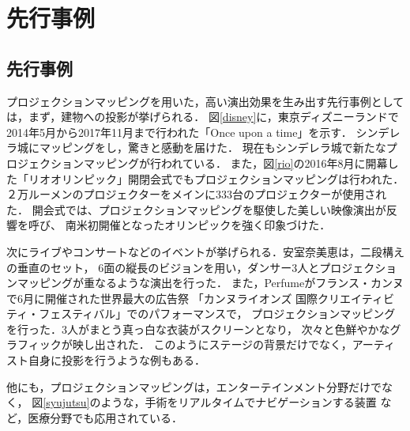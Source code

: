 \chapter{先行事例}
\thispagestyle{fancy}

\section{先行事例}
プロジェクションマッピングを用いた，高い演出効果を生み出す先行事例としては，まず，建物への投影が挙げられる．
図\ref{disney}に，東京ディズニーランドで2014年5月から2017年11月まで行われた「Once upon a time」を示す．%
シンデレラ城にマッピングをし，驚きと感動を届けた．
現在もシンデレラ城で新たなプロジェクションマッピングが行われている\cite{once}．
また，図\ref{rio}の2016年8月に開幕した「リオオリンピック」開閉会式でもプロジェクションマッピングは行われた． 
２万ルーメンのプロジェクターをメインに333台のプロジェクターが使用された．
開会式では、プロジェクションマッピングを駆使した美しい映像演出が反響を呼び、
南米初開催となったオリンピックを強く印象づけた\cite{olympic}．

次にライブやコンサートなどのイベントが挙げられる．安室奈美恵は，二段構えの垂直のセット，
6面の縦長のビジョンを用い，ダンサー3人とプロジェクションマッピングが重なるような演出を行った\cite{amuro}．
また，Perfumeがフランス・カンヌで6月に開催された世界最大の広告祭
「カンヌライオンズ 国際クリエイティビティ・フェスティバル」でのパフォーマンスで，
プロジェクションマッピングを行った．3人がまとう真っ白な衣装がスクリーンとなり，
次々と色鮮やかなグラフィックが映し出された．%
このようにステージの背景だけでなく，アーティスト自身に投影を行うような例もある．

他にも，プロジェクションマッピングは，エンターテインメント分野だけでなく，
図\ref{syujutsu}のような，手術をリアルタイムでナビゲーションする装置%
など，医療分野でも応用されている．


\clearpage

